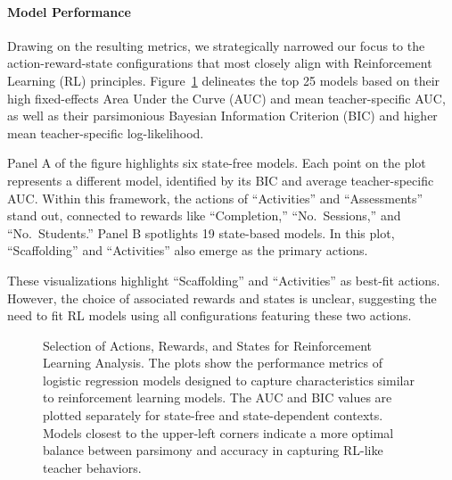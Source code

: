 \documentclass[
  number,
  preprint,
  3p,
  onecolumn]{elsarticle}
\let\oldparagraph\paragraph
\renewcommand{\paragraph}[1]{\oldparagraph{#1}\mbox{}}
\begin{document}
\paragraph{Model Performance}\label{model-performance}

Drawing on the resulting metrics, we strategically narrowed our focus to
the action-reward-state configurations that most closely align with
Reinforcement Learning (RL) principles. Figure~\ref{fig-RL-exploration}
delineates the top 25 models based on their high fixed-effects Area
Under the Curve (AUC) and mean teacher-specific AUC, as well as their
parsimonious Bayesian Information Criterion (BIC) and higher mean
teacher-specific log-likelihood.

Panel A of the figure highlights six state-free models. Each point on
the plot represents a different model, identified by its BIC and average
teacher-specific AUC. Within this framework, the actions of
``Activities'' and ``Assessments'' stand out, connected to rewards like
``Completion,'' ``No.~Sessions,'' and ``No.~Students.'' Panel B
spotlights 19 state-based models. In this plot, ``Scaffolding'' and
``Activities'' also emerge as the primary actions.

These visualizations highlight ``Scaffolding'' and ``Activities'' as
best-fit actions. However, the choice of associated rewards and states
is unclear, suggesting the need to fit RL models using all
configurations featuring these two actions.

\begin{figure}

\begin{minipage}{0.50\linewidth}



\end{minipage}%
%
\begin{minipage}{0.50\linewidth}



\end{minipage}%

\caption{\label{fig-RL-exploration}Selection of Actions, Rewards, and
States for Reinforcement Learning Analysis. The plots show the
performance metrics of logistic regression models designed to capture
characteristics similar to reinforcement learning models. The AUC and
BIC values are plotted separately for state-free and state-dependent
contexts. Models closest to the upper-left corners indicate a more
optimal balance between parsimony and accuracy in capturing RL-like
teacher behaviors.}

\end{figure}%
\end{document}
